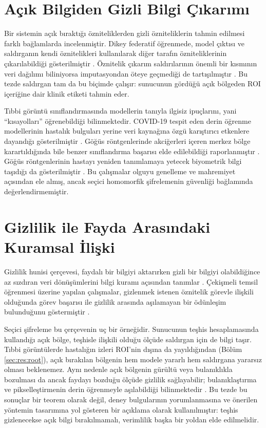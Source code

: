 \section{Açık Bilgiden Gizli Bilgi Çıkarımı}\label{sec:inference}

Bir sistemin açık bıraktığı özniteliklerden gizli özniteliklerin tahmin edilmesi farklı bağlamlarda incelenmiştir. Dikey federatif öğrenmede, model çıktısı ve saldırganın kendi öznitelikleri kullanılarak diğer tarafın özniteliklerinin çıkarılabildiği gösterilmiştir \cite{luo2021feature}. Öznitelik çıkarım saldırılarının önemli bir kısmının veri dağılımı biliniyorsa imputasyondan öteye geçmediği de tartışılmıştır \cite{jayaraman2022imputation}. Bu tezde saldırgan tam da bu biçimde çalışır: sunucunun gördüğü açık bölgeden ROI içeriğine dair klinik etiketi tahmin eder.

Tıbbi görüntü sınıflandırmasında modellerin tanıyla ilgisiz ipuçlarını, yani ``kısayolları'' öğrenebildiği bilinmektedir. COVID-19 tespit eden derin öğrenme modellerinin hastalık bulguları yerine veri kaynağına özgü karıştırıcı etkenlere dayandığı gösterilmiştir \cite{degrave2021shortcuts}. Göğüs röntgenlerinde akciğerleri içeren merkez bölge karartıldığında bile benzer sınıflandırma başarısı elde edilebildiği raporlanmıştır \cite{maguolo2021critic}. Göğüs röntgenlerinin hastayı yeniden tanımlamaya yetecek biyometrik bilgi taşıdığı da gösterilmiştir \cite{packhauser2022reid}. Bu çalışmalar olguyu genelleme ve mahremiyet açısından ele almış, ancak seçici homomorfik şifrelemenin güvenliği bağlamında değerlendirmemiştir.

\section{Gizlilik ile Fayda Arasındaki Kuramsal İlişki}\label{sec:privacyutility}

Gizlilik hunisi çerçevesi, faydalı bir bilgiyi aktarırken gizli bir bilgiyi olabildiğince az sızdıran veri dönüşümlerini bilgi kuramı açısından tanımlar \cite{makhdoumi2014funnel}. Çekişmeli temsil öğrenmesi üzerine yapılan çalışmalar, gizlenmek istenen öznitelik görevle ilişkili olduğunda görev başarısı ile gizlilik arasında aşılamayan bir ödünleşim bulunduğunu göstermiştir \cite{zhao2020tradeoffs}.

Seçici şifreleme bu çerçevenin uç bir örneğidir. Sunucunun teşhis hesaplamasında kullandığı açık bölge, teşhisle ilişkili olduğu ölçüde saldırgan için de bilgi taşır. Tıbbi görüntülerde hastalığın izleri ROI'nin dışına da yayıldığından (Bölüm \ref{sec:res:root}), açık bırakılan bölgenin hem modele yararlı hem saldırgana yararsız olması beklenemez. Aynı nedenle açık bölgenin gürültü veya bulanıklıkla bozulması da ancak faydayı bozduğu ölçüde gizlilik sağlayabilir; bulanıklaştırma ve pikselleştirmenin derin öğrenmeyle aşılabildiği bilinmektedir \cite{mcpherson2016obfuscation}. Bu tezde bu sonuçlar bir teorem olarak değil, deney bulgularının yorumlanmasına ve önerilen yöntemin tasarımına yol gösteren bir açıklama olarak kullanılmıştır: teşhis gizlenecekse açık bilgi bırakılmamalı, verimlilik başka bir yoldan elde edilmelidir.


